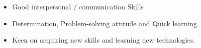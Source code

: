 %
%
%

\twocolumnsection   
{
\begin{skills}
\end{skills}}
{
\vspace{1em}
\begin{itemize}
    \item Good interpersonal / communication Skills
    \item Determination, Problem-solving attitude and Quick learning
    \item Keen on acquiring new skills and learning new technologies.
\end{itemize}
}
